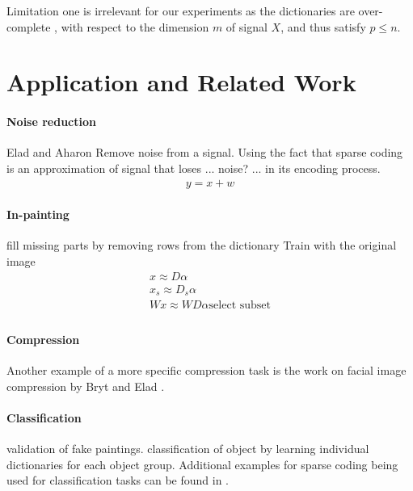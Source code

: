 Limitation one is irrelevant for our experiments as the dictionaries are over-complete 
, with respect to the dimension $m$ of signal $X$, and thus satisfy $p\leq n$.

\section{Application and Related Work}

\paragraph{Noise reduction}
Elad and Aharon\cite{Elad2006}
Remove noise from a signal. 
Using the fact that sparse coding is an approximation of signal that loses ...
noise? ... in its encoding process. 
\begin{align*}
y = x + w
\end{align*}



\paragraph{In-painting}
fill missing parts by removing rows from the dictionary
Train with the original image
\begin{align*}
x \approx D\alpha\\
x_s \approx D_s\alpha\\
Wx \approx WD\alpha\text{select subset}\\
\end{align*}

\cite{mairal08sparse}

\paragraph{Compression} \cite{Lewicki1999,Murray2006}  
Another example of a more specific compression task is the
work on facial image compression by Bryt and Elad \cite{Bryt2008}.

\paragraph{Classification} \cite{?} validation of fake paintings. 
\cite{?} classification of object by learning  individual dictionaries for each
object group. Additional examples for sparse coding  being used for
classification tasks can be found in
\cite{Raina2007,BradleyBagnel2009,Mairal2008,Mairal2008b,Bar2009,Yang2009}.

